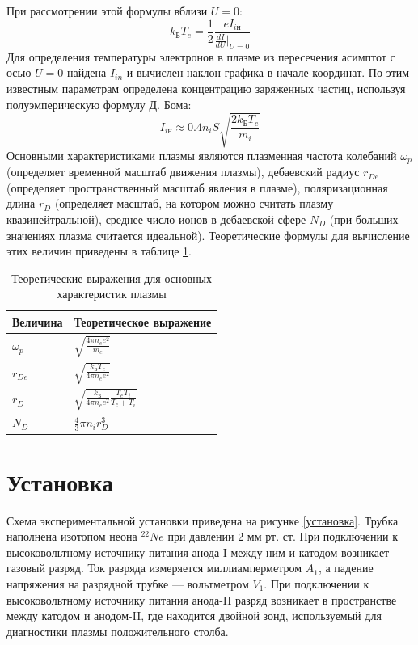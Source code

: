 \documentclass[a4paper,12pt]{article} %
\begin{document}
При рассмотрении этой формулы вблизи $U = 0$:
\begin{equation}
\label{двойной_зонд}
k_БT_e = \frac{1}{2}\frac{eI_{iн}}{\frac{dI}{dU}|_{U=0}}
\end{equation}
Для определения температуры электронов в плазме из пересечения асимптот с осью $U=0$ найдена $I_{in}$ и вычислен наклон графика в начале координат. По этим известным параметрам определена концентрацию заряженных частиц, используя полуэмперическую формулу Д. Бома: \cite{labnik}
\begin{equation} 
\label{бом}
I_{iн} \approx 0.4 n_iS\sqrt{\frac{2k_БT_e}{m_i}}
\end{equation}
Основными характеристиками плазмы являются плазменная частота колебаний $\omega_p$ (определяет временной масштаб движения плазмы), дебаевский радиус $r_{De}$ (определяет пространственный масштаб явления в плазме), поляризационная длина $r_D$ (определяет масштаб, на котором можно считать плазму квазинейтральной), среднее число ионов в дебаевской сфере $N_D$ (при больших значениях плазма считается идеальной). Теоретические формулы для вычисление этих величин приведены в таблице \ref{формулы}.\cite{labnik}
\begin{table}[h!]
\caption{Теоретические выражения для основных характеристик плазмы}
\label{формулы}
\begin{tabular}{|l|l|}
\hline
Величина   & Теоретическое выражение                                 \\ \hline
$\omega_p$ & $\sqrt{\frac{4\pi n_e e^2}{m_e}}$                       \\ \hline
$r_{De} $  & $\sqrt{\frac{k_Б T_e}{4\pi n_e e^2}}$                   \\ \hline
$r_D $     & $\sqrt{\frac{k_Б}{4\pi n_e e^2}\frac{T_eT_i}{T_e+T_i}}$ \\ \hline
$N_D $     & $\frac{4}{3}\pi n_ir^3_D$                               \\ \hline
\end{tabular}
\end{table}

\section{Установка}
Схема экспериментальной установки приведена на рисунке \ref{установка}. Трубка наполнена изотопом неона $^{22}Ne$ при давлении 2 мм рт. ст. При подключении к высоковольтному источнику питания анода-I между ним и катодом возникает газовый разряд. Ток разряда измеряется миллиамперметром $A_1$, а падение
напряжения на разрядной трубке — вольтметром $V_1$. При подключении к высоковольтному источнику питания анода-II разряд возникает в пространстве между катодом и анодом-II, где находится двойной зонд, используемый
для диагностики плазмы положительного столба.
\end{document}
